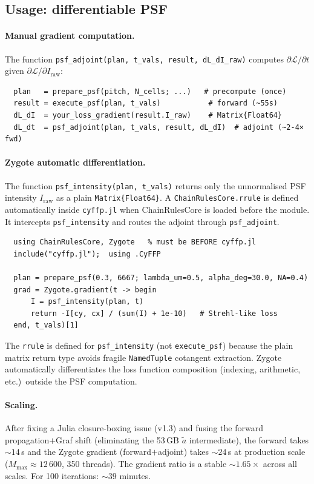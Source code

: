 \documentclass[11pt,a4paper]{article}
\begin{document}
\subsection{Usage: differentiable PSF}

\paragraph{Manual gradient computation.}
The function \texttt{psf\_adjoint(plan, t\_vals, result, dL\_dI\_raw)} computes
$\partial\mathcal{L}/\partial t$ given $\partial\mathcal{L}/\partial I_{\mathrm{raw}}$:
\begin{verbatim}
  plan   = prepare_psf(pitch, N_cells; ...)   # precompute (once)
  result = execute_psf(plan, t_vals)           # forward (~55s)
  dL_dI  = your_loss_gradient(result.I_raw)    # Matrix{Float64}
  dL_dt  = psf_adjoint(plan, t_vals, result, dL_dI)  # adjoint (~2-4× fwd)
\end{verbatim}

\paragraph{Zygote automatic differentiation.}
The function \texttt{psf\_intensity(plan, t\_vals)} returns only the
unnormalised PSF intensity $I_{\mathrm{raw}}$ as a plain \texttt{Matrix\{Float64\}}.
A \texttt{ChainRulesCore.rrule} is defined automatically inside
\texttt{cyffp.jl} when ChainRulesCore is loaded before the module.
It intercepts \texttt{psf\_intensity} and routes the adjoint through
\texttt{psf\_adjoint}.

\begin{verbatim}
  using ChainRulesCore, Zygote   % must be BEFORE cyffp.jl
  include("cyffp.jl");  using .CyFFP

  plan = prepare_psf(0.3, 6667; lambda_um=0.5, alpha_deg=30.0, NA=0.4)
  grad = Zygote.gradient(t -> begin
      I = psf_intensity(plan, t)
      return -I[cy, cx] / (sum(I) + 1e-10)   # Strehl-like loss
  end, t_vals)[1]
\end{verbatim}

\noindent
The \texttt{rrule} is defined for \texttt{psf\_intensity} (not
\texttt{execute\_psf}) because the plain matrix return type avoids fragile
\texttt{NamedTuple} cotangent extraction.  Zygote automatically differentiates
the loss function composition (indexing, arithmetic, etc.)\ outside the PSF
computation.

\paragraph{Scaling.}
After fixing a Julia closure-boxing issue (v1.3) and fusing the
forward propagation$+$Graf shift (eliminating the 53\,GB
$\tilde a$ intermediate), the forward takes ${\sim}14$\,s and
the Zygote gradient (forward$+$adjoint) takes ${\sim}24$\,s at
production scale ($M_{\max} \approx 12\,600$, 350 threads).
The gradient ratio is a stable ${\sim}1.65\times$ across all scales.
For 100 iterations: ${\sim}39$ minutes.
\end{document}
